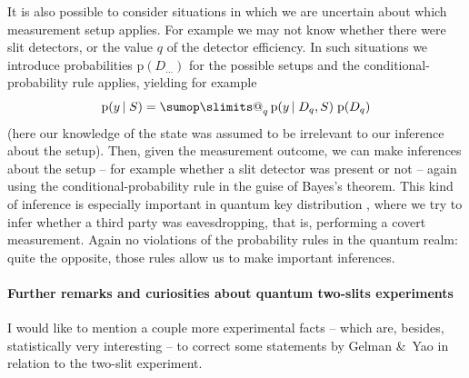\documentclass[\ifafour a4paper,12pt,\else a5paper,10pt,\fi%
onecolumn,oneside,article,%
british%
]{memoir}
\makeatletter
\theoremstyle{remark}
\theoremstyle{innote}
\def\sum{\DOTSI\sumop\slimits@}
\newcommand*{\citep}{\parencites}%
\newcommand*{\amp}{\&}
\newcommand*{\pf}{\mathrm{p}}%
\renewcommand*{\|}[1][]{\nonscript\,#1\vert\nonscript\;\mathopen{}}
\newcommand*{\tsum}{\mathop{\textstyle\sum}\nolimits}
\newcommand*{\yDq}{D_{q}}
\makeatother
\begin{document}
It is also possible to consider situations in which we are uncertain about
which measurement setup applies. For example we may not know whether there
were slit detectors, or the value $q$ of the detector efficiency. In such
situations we introduce probabilities $\pf(D_{\dotso})$ for the possible
setups and the conditional-probability rule applies, yielding for example
\begin{equation}
  \label{eq:conditional_setups}
  \pf(y \| S) = \tsum_{q} \pf(y \| \yDq, S)\;\pf(\yDq)
\end{equation}
(here our knowledge of the state was assumed to be irrelevant to our
inference about the setup). Then, given the measurement outcome, we can
make inferences about the setup
\citep{barnettetal2003,zimanetal2004_r2006,darianoetal2004}[see
also][]{rigoetal1998} -- for example whether a slit detector was present or
not -- again using the conditional-probability rule in the guise of Bayes's
theorem. This kind of inference is especially important in quantum key
distribution \citep{nielsenetal2000_r2010}, where we try to infer whether a
third party was eavesdropping, that is, performing a covert measurement.
Again no violations of the probability rules in the quantum realm: quite
the opposite, those rules allow us to make important inferences.


\bigskip

\paragraph{Further remarks and curiosities about quantum two-slits
  experiments}

I would like to mention a couple more experimental facts -- which are,
besides, statistically very interesting -- to correct some statements by
Gelman \amp\ Yao in relation to the two-slit experiment.
\end{document}
